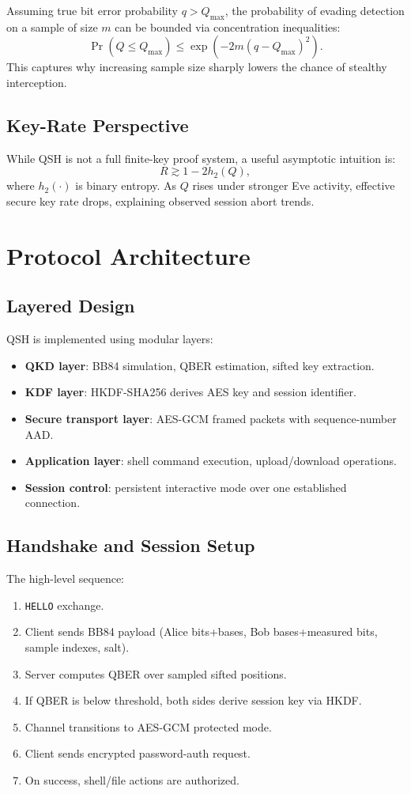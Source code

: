 \documentclass[11pt,a4paper]{article}
\begin{document}
Assuming true bit error probability $q>Q_{\max}$, the probability of evading detection on a sample of size $m$ can be bounded via concentration inequalities:
\[
\Pr(\widehat{Q}\le Q_{\max}) \le \exp\left(-2m(q-Q_{\max})^2\right).
\]
This captures why increasing sample size sharply lowers the chance of stealthy interception.

\subsection{Key-Rate Perspective}
While QSH is not a full finite-key proof system, a useful asymptotic intuition is:
\[
R \gtrsim 1 - 2h_2(Q),
\]
where $h_2(\cdot)$ is binary entropy. As $Q$ rises under stronger Eve activity, effective secure key rate drops, explaining observed session abort trends.

\section{Protocol Architecture}
\subsection{Layered Design}
QSH is implemented using modular layers:
\begin{itemize}[leftmargin=1.5em]
  \item \textbf{QKD layer}: BB84 simulation, QBER estimation, sifted key extraction.
  \item \textbf{KDF layer}: HKDF-SHA256 derives AES key and session identifier.
  \item \textbf{Secure transport layer}: AES-GCM framed packets with sequence-number AAD.
  \item \textbf{Application layer}: shell command execution, upload/download operations.
  \item \textbf{Session control}: persistent interactive mode over one established connection.
\end{itemize}

\subsection{Handshake and Session Setup}
The high-level sequence:
\begin{enumerate}[leftmargin=1.5em]
  \item \texttt{HELLO} exchange.
  \item Client sends BB84 payload (Alice bits+bases, Bob bases+measured bits, sample indexes, salt).
  \item Server computes QBER over sampled sifted positions.
  \item If QBER is below threshold, both sides derive session key via HKDF.
  \item Channel transitions to AES-GCM protected mode.
  \item Client sends encrypted password-auth request.
  \item On success, shell/file actions are authorized.
\end{enumerate}
\end{document}
